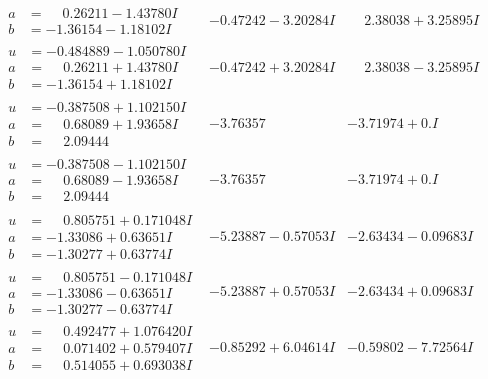 \documentclass[1p]{elsarticle_modified}
\theoremstyle{definition}
\begin{document}
$$\begin{array}{c|c|c}
\begin{aligned}
a &= \phantom{-}0.26211 - 1.43780 I \\
b &= -1.36154 - 1.18102 I\end{aligned}
 & -0.47242 - 3.20284 I & \phantom{-}2.38038 + 3.25895 I \\ \hline\begin{aligned}
u &= -0.484889 - 1.050780 I \\
a &= \phantom{-}0.26211 + 1.43780 I \\
b &= -1.36154 + 1.18102 I\end{aligned}
 & -0.47242 + 3.20284 I & \phantom{-}2.38038 - 3.25895 I \\ \hline\begin{aligned}
u &= -0.387508 + 1.102150 I \\
a &= \phantom{-}0.68089 + 1.93658 I \\
b &= \phantom{-}2.09444\phantom{ +0.000000I}\end{aligned}
 & -3.76357\phantom{ +0.000000I} & -3.71974 + 0. I\phantom{ +0.000000I} \\ \hline\begin{aligned}
u &= -0.387508 - 1.102150 I \\
a &= \phantom{-}0.68089 - 1.93658 I \\
b &= \phantom{-}2.09444\phantom{ +0.000000I}\end{aligned}
 & -3.76357\phantom{ +0.000000I} & -3.71974 + 0. I\phantom{ +0.000000I} \\ \hline\begin{aligned}
u &= \phantom{-}0.805751 + 0.171048 I \\
a &= -1.33086 + 0.63651 I \\
b &= -1.30277 + 0.63774 I\end{aligned}
 & -5.23887 - 0.57053 I & -2.63434 - 0.09683 I \\ \hline\begin{aligned}
u &= \phantom{-}0.805751 - 0.171048 I \\
a &= -1.33086 - 0.63651 I \\
b &= -1.30277 - 0.63774 I\end{aligned}
 & -5.23887 + 0.57053 I & -2.63434 + 0.09683 I \\ \hline\begin{aligned}
u &= \phantom{-}0.492477 + 1.076420 I \\
a &= \phantom{-}0.071402 + 0.579407 I \\
b &= \phantom{-}0.514055 + 0.693038 I\end{aligned}
 & -0.85292 + 6.04614 I & -0.59802 - 7.72564 I \\ \hline\begin{aligned}

\end{aligned}
\end{array}$$
\end{document}

